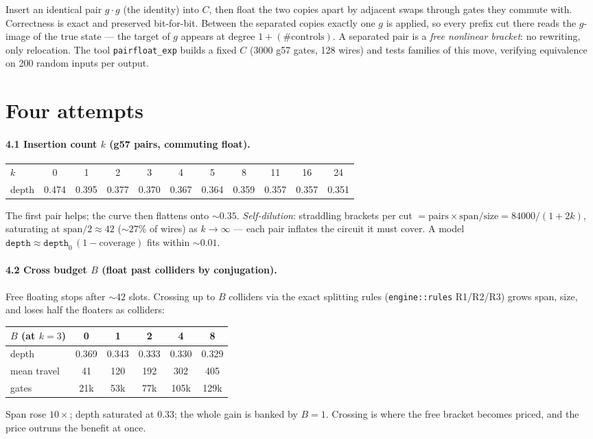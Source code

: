 \documentclass[11pt]{article}
\newcommand{\code}[1]{\texttt{#1}}
\begin{document}
Insert an identical pair $g\cdot g$ (the identity) into $C$, then float the two
copies apart by adjacent swaps through gates they commute with. Correctness is
exact and preserved bit-for-bit. Between the separated copies exactly one $g$
is applied, so every prefix cut there reads the $g$-image of the true state ---
the target of $g$ appears at degree $1+(\#\text{controls})$. A separated pair
is a \emph{free nonlinear bracket}: no rewriting, only relocation. The tool
\code{pairfloat\_exp} builds a fixed $C$ (3000 g57 gates, 128 wires) and tests
families of this move, verifying equivalence on 200 random inputs per output.

\section{Four attempts}

\paragraph{4.1 Insertion count $k$ (g57 pairs, commuting float).}
\begin{center}
\begin{tabular}{lcccccccccc}
\toprule
$k$ & 0 & 1 & 2 & 3 & 4 & 5 & 8 & 11 & 16 & 24\\
depth & 0.474 & 0.395 & 0.377 & 0.370 & 0.367 & 0.364 & 0.359 & 0.357 & 0.357 & 0.351\\
\bottomrule
\end{tabular}
\end{center}
The first pair helps; the curve then flattens onto ${\sim}0.35$. \emph{Self-dilution}:
straddling brackets per cut $=\text{pairs}\times\text{span}/\text{size}
=84000/(1+2k)$, saturating at $\text{span}/2\approx42$ ($\sim27\%$ of wires) as
$k\to\infty$ --- each pair inflates the circuit it must cover. A model
$\code{depth}\approx\code{depth}_0\,(1-\text{coverage})$ fits within ${\sim}0.01$.

\paragraph{4.2 Cross budget $B$ (float past colliders by conjugation).} Free
floating stops after ${\sim}42$ slots. Crossing up to $B$ colliders via the
exact splitting rules (\code{engine::rules} R1/R2/R3) grows span, size, and
loses half the floaters as colliders:
\begin{center}
\begin{tabular}{lccccc}
\toprule
$B$ (at $k=3$) & 0 & 1 & 2 & 4 & 8\\
\midrule
depth & 0.369 & 0.343 & 0.333 & 0.330 & 0.329\\
mean travel & 41 & 120 & 192 & 302 & 405\\
gates & 21k & 53k & 77k & 105k & 129k\\
\bottomrule
\end{tabular}
\end{center}
Span rose $10\times$; depth saturated at $0.33$; the whole gain is banked by
$B=1$. Crossing is where the free bracket becomes priced, and the price outruns
the benefit at once.
\end{document}
